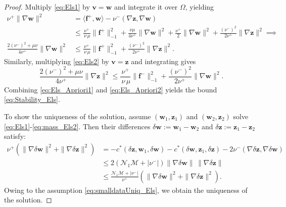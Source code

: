 \documentclass[3p]{elsarticle}
\def\nuplus{\nu^{+}}
\def\numinus{\nu^{-}}
\def\fplus{\mathbf{f}^{+}}
\def\fminus{\mathbf{f}^{-}}
\def\V#1{\mathbf{#1}}
\newcommand{\Mbd}{\mathcal{M}}
\newcommand{\Nbd}{\mathcal{N}}
\begin{document}
\begin{proof}
Multiply \eqref{eq:Els1} by $\V{v}=\V{w}$ and integrate it over $\Omega$, yielding 
\begin{equation}
\label{eq:Els_Apriori1}
\begin{aligned}
\nuplus \|\nabla \V{w}\|^2 &= 
\langle \fplus,\V{w} \rangle
- \numinus (\nabla \V{z},\nabla \V{w})\\
& \le \frac{\nuplus}{\, \nu \, \mu}\|\fplus\|^2_{-1} + \frac{\nu \mu}{4\nuplus}\|\nabla \V{w}\|^2
+ \frac{\nuplus}{2}\|\nabla \V{w}\|^2
+ \frac{(\numinus)^2}{2\nuplus}\|\nabla \V{z}\|^2 \implies \\
\frac{2 (\numinus)^2+\mu\nu}{4 \nuplus}\|\nabla \V{w}\|^2 & \le \frac{\nuplus}{\, \nu \, \mu}\|\fplus\|^2_{-1}
+ \frac{(\numinus)^2}{2\nuplus}\|\nabla \V{z}\|^2.
 \end{aligned}
 \end{equation}
 Similarly, multiplying \eqref{eq:Els2} by $\V{v}=\V{z}$ and integrating gives
\begin{equation}
    \label{eq:Els_Apriori2}
    \frac{2 (\numinus)^2+\mu\nu}{4 \nuplus}\|\nabla \V{z}\|^2  \le \frac{\nuplus}{\, \nu \, \mu}\|\fminus\|^2_{-1}
+ \frac{(\numinus)^2}{2\nuplus}\|\nabla \V{w}\|^2.
\end{equation}
Combining \eqref{eq:Els_Apriori1} and \eqref{eq:Els_Apriori2} yields the bound \eqref{eq:Stability_Els}. 

To show the uniqueness of the solution, assume $(\V{w}_1,\V{z}_1)$ and $(\V{w}_2,\V{z}_2)$ solve \eqref{eq:Els1}-\eqref{eq:mass_Els2}. Then their differences $\delta \V{w}:=\V{w}_1-\V{w}_2$ and $\delta \V{z}:=\V{z}_1-\V{z}_2$ satisfy:
\begin{equation}\label{eq:Uniquness_Els1}
\begin{aligned}  
\nuplus (\| \nabla \delta \V{w}\|^2+\| \nabla \delta \V{z}\|^2)
& = - c^*(\delta \V{z}, \V{w}_1, \delta \V{w}) - c^*(\delta \V{w}, \V{z}_1, \delta \V{z}) - 2\numinus (\nabla \delta \V{z}, \nabla  \delta \V{w}) \\ 
& \le 2(\Nbd_1 \Mbd + |\numinus|) \| \nabla \delta \V{w}\|\, \| \nabla \delta \V{z}\| \\ 
& \le \frac{\Nbd_1 \Mbd + |\numinus|}{\nuplus}(\| \nabla \delta \V{w}\|^2+\| \nabla \delta \V{z}\|^2).
\end{aligned}
\end{equation}
Owing to the assumption \eqref{eq:smalldataUniq_Els}, we obtain the uniqueness of the solution.
\end{proof}
\end{document}
